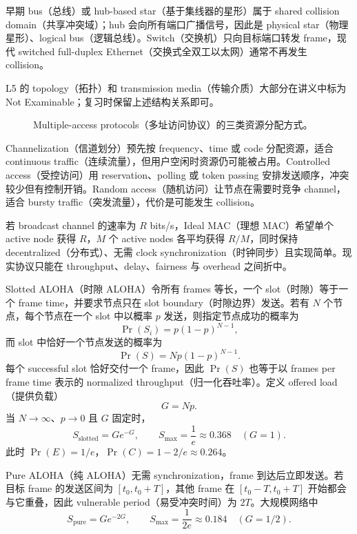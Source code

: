 早期 bus（总线）或 hub-based star（基于集线器的星形）属于 shared collision domain（共享冲突域）；hub 会向所有端口广播信号，因此是 physical star（物理星形）、logical bus（逻辑总线）。Switch（交换机）只向目标端口转发 frame，现代 switched full-duplex Ethernet（交换式全双工以太网）通常不再发生 collision。

L5 的 topology（拓扑）和 transmission media（传输介质）大部分在讲义中标为 Not Examinable；复习时保留上述结构关系即可。


\begin{figure}[htbp]
  \centering
  \resizebox{0.96\textwidth}{!}{}
  \caption{Multiple-access protocols（多址访问协议）的三类资源分配方式。}
  \label{fig:sc2008-l03-mac-taxonomy}
\end{figure}

Channelization（信道划分）预先按 frequency、time 或 code 分配资源，适合 continuous traffic（连续流量），但用户空闲时资源仍可能被占用。Controlled access（受控访问）用 reservation、polling 或 token passing 安排发送顺序，冲突较少但有控制开销。Random access（随机访问）让节点在需要时竞争 channel，适合 bursty traffic（突发流量），代价是可能发生 collision。

若 broadcast channel 的速率为 $R$ bits/s，Ideal MAC（理想 MAC）希望单个 active node 获得 $R$，$M$ 个 active nodes 各平均获得 $R/M$，同时保持 decentralized（分布式）、无需 clock synchronization（时钟同步）且实现简单。现实协议只能在 throughput、delay、fairness 与 overhead 之间折中。


Slotted ALOHA（时隙 ALOHA）令所有 frames 等长，一个 slot（时隙）等于一个 frame time，并要求节点只在 slot boundary（时隙边界）发送。若有 $N$ 个节点，每个节点在一个 slot 中以概率 $p$ 发送，则指定节点成功的概率为
\[
  \Pr(S_i)=p(1-p)^{N-1},
\]
而 slot 中恰好一个节点发送的概率为
\[
  \boxed{\Pr(S)=Np(1-p)^{N-1}}.
\]
每个 successful slot 恰好交付一个 frame，因此 $\Pr(S)$ 也等于以 frames per frame time 表示的 normalized throughput（归一化吞吐率）。定义 offered load（提供负载）
\[
  G=Np.
\]
当 $N\to\infty$、$p\to0$ 且 $G$ 固定时，
\[
  S_{\mathrm{slotted}}=Ge^{-G},
  \qquad
  \boxed{S_{\max}=\frac{1}{e}\approx0.368\quad(G=1)}.
\]
此时 $\Pr(E)=1/e$，$\Pr(C)=1-2/e\approx0.264$。

Pure ALOHA（纯 ALOHA）无需 synchronization，frame 到达后立即发送。若目标 frame 的发送区间为 $[t_0,t_0+T]$，其他 frame 在 $[t_0-T,t_0+T]$ 开始都会与它重叠，因此 vulnerable period（易受冲突时间）为 $2T$。大规模网络中
\[
  S_{\mathrm{pure}}=Ge^{-2G},
  \qquad
  \boxed{S_{\max}=\frac{1}{2e}\approx0.184\quad(G=1/2)}.
\]

